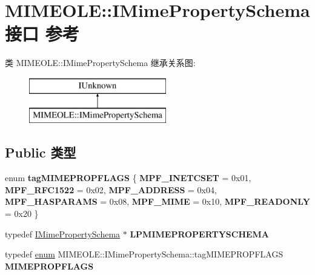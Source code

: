 \hypertarget{interface_m_i_m_e_o_l_e_1_1_i_mime_property_schema}{}\section{M\+I\+M\+E\+O\+LE\+:\+:I\+Mime\+Property\+Schema接口 参考}
\label{interface_m_i_m_e_o_l_e_1_1_i_mime_property_schema}
类 M\+I\+M\+E\+O\+LE\+:\+:I\+Mime\+Property\+Schema 继承关系图\+:\begin{figure}[H]
\begin{center}
\leavevmode
\includegraphics[height=2.000000cm]{interface_m_i_m_e_o_l_e_1_1_i_mime_property_schema}
\end{center}
\end{figure}
\subsection*{Public 类型}
\begin{DoxyCompactItemize}
\item 
\mbox{\label{interface_m_i_m_e_o_l_e_1_1_i_mime_property_schema_ad37322370b46fc498f82f8f09316a26c}} 
enum {\bfseries tag\+M\+I\+M\+E\+P\+R\+O\+P\+F\+L\+A\+GS} \{ \newline
{\bfseries M\+P\+F\+\_\+\+I\+N\+E\+T\+C\+S\+ET} = 0x01, 
{\bfseries M\+P\+F\+\_\+\+R\+F\+C1522} = 0x02, 
{\bfseries M\+P\+F\+\_\+\+A\+D\+D\+R\+E\+SS} = 0x04, 
{\bfseries M\+P\+F\+\_\+\+H\+A\+S\+P\+A\+R\+A\+MS} = 0x08, 
\newline
{\bfseries M\+P\+F\+\_\+\+M\+I\+ME} = 0x10, 
{\bfseries M\+P\+F\+\_\+\+R\+E\+A\+D\+O\+N\+LY} = 0x20
 \}
\item 
\mbox{\label{interface_m_i_m_e_o_l_e_1_1_i_mime_property_schema_a8427bd6be0b4028277b9e34724a4f85e}} 
typedef \hyperlink{interface_m_i_m_e_o_l_e_1_1_i_mime_property_schema}{I\+Mime\+Property\+Schema} $\ast$ {\bfseries L\+P\+M\+I\+M\+E\+P\+R\+O\+P\+E\+R\+T\+Y\+S\+C\+H\+E\+MA}
\item 
\mbox{\label{interface_m_i_m_e_o_l_e_1_1_i_mime_property_schema_a564f1817764f8ead9385e6699b2e1858}} 
typedef \hyperlink{interfaceenum}{enum} M\+I\+M\+E\+O\+L\+E\+::\+I\+Mime\+Property\+Schema\+::tag\+M\+I\+M\+E\+P\+R\+O\+P\+F\+L\+A\+GS {\bfseries M\+I\+M\+E\+P\+R\+O\+P\+F\+L\+A\+GS}
\end{DoxyCompactItemize}
